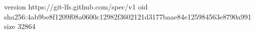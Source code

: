 version https://git-lfs.github.com/spec/v1
oid sha256:4ab9be8f1209f08a0600c12982f3602121d3177baae84e125984563e8790a991
size 32864
